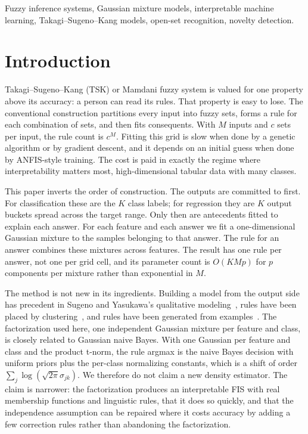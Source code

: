 \documentclass[journal]{IEEEtran}
\begin{document}
\begin{IEEEkeywords}
Fuzzy inference systems, Gaussian mixture models, interpretable machine learning, Takagi--Sugeno--Kang models, open-set recognition, novelty detection.
\end{IEEEkeywords}

\section{Introduction}
 Takagi--Sugeno--Kang (TSK) or Mamdani fuzzy system is valued for one property above its accuracy: a person can read its rules. That property is easy to lose. The conventional construction partitions every input into fuzzy sets, forms a rule for each combination of sets, and then fits consequents. With $M$ inputs and $c$ sets per input, the rule count is $c^{M}$. Fitting this grid is slow when done by a genetic algorithm or by gradient descent, and it depends on an initial guess when done by ANFIS-style training. The cost is paid in exactly the regime where interpretability matters most, high-dimensional tabular data with many classes.

This paper inverts the order of construction. The outputs are committed to first. For classification these are the $K$ class labels; for regression they are $K$ output buckets spread across the target range. Only then are antecedents fitted to explain each answer. For each feature and each answer we fit a one-dimensional Gaussian mixture to the samples belonging to that answer. The rule for an answer combines these mixtures across features. The result has one rule per answer, not one per grid cell, and its parameter count is $O(K M p)$ for $p$ components per mixture rather than exponential in $M$.

The method is not new in its ingredients. Building a model from the output side has precedent in Sugeno and Yasukawa's qualitative modeling~\cite{sugeno1993qualitative}, rules have been placed by clustering~\cite{chiu1994fuzzy}, and rules have been generated from examples~\cite{wang1992generating}. The factorization used here, one independent Gaussian mixture per feature and class, is closely related to Gaussian naive Bayes. With one Gaussian per feature and class and the product t-norm, the rule argmax is the naive Bayes decision with uniform priors plus the per-class normalizing constants, which is a shift of order $\sum_j \log(\sqrt{2\pi}\sigma_{jk})$. We therefore do not claim a new density estimator. The claim is narrower: the factorization produces an interpretable FIS with real membership functions and linguistic rules, that it does so quickly, and that the independence assumption can be repaired where it costs accuracy by adding a few correction rules rather than abandoning the factorization.
\end{document}
